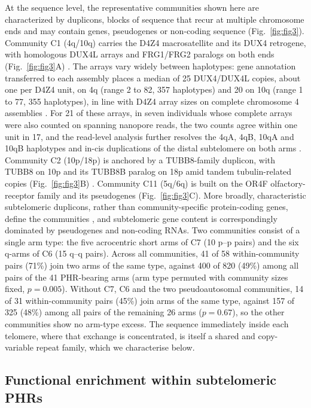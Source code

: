 \documentclass[pdflatex,mathphys]{jnl}
\begin{document}
At the sequence level, the representative communities shown here are
characterized by duplicons, blocks of sequence that recur at multiple
chromosome ends and may contain genes, pseudogenes or non-coding sequence
(Fig.~\ref{fig:fig3}).
Community C1 (4q/10q) carries the D4Z4 macrosatellite and its DUX4 retrogene, with
homologous DUX4L arrays and FRG1/FRG2 paralogs on both ends (Fig.~\ref{fig:fig3}A)
\cite{dux4_d4z4_fshd_lemmers2010worldwide,Cabianca2012}.
The arrays vary widely between haplotypes: gene annotation transferred to each assembly
places a median of 25 DUX4/DUX4L copies, about one per D4Z4 unit, on 4q (range 2 to 82,
357 haplotypes) and 20 on 10q (range 1 to 77, 355 haplotypes), in line with D4Z4 array
sizes on complete chromosome 4 assemblies \cite{Lucas2026}.
For 21 of these arrays, in seven individuals whose complete arrays were also counted on spanning
nanopore reads, the two counts agree within one unit in 17, and the read-level analysis further
resolves the 4qA, 4qB, 10qA and 10qB haplotypes and in-cis duplications of the distal subtelomere on
both arms \cite{Xiao2026}.
Community C2 (10p/18p) is anchored by a TUBB8-family duplicon, with TUBB8 on
10p and its TUBB8B paralog on 18p amid tandem tubulin-related copies
(Fig.~\ref{fig:fig3}B) \cite{Linardopoulou2005}.
Community C11 (5q/6q) is built on the OR4F olfactory-receptor family and its
pseudogenes (Fig.~\ref{fig:fig3}C).
More broadly, characteristic subtelomeric duplicons, rather than community-specific protein-coding genes, define the communities
\cite{Ambrosini2007}, and subtelomeric gene content is correspondingly dominated by pseudogenes and
non-coding RNAs. Two communities consist of a single arm type: the five acrocentric short arms of
C7 (10 p--p pairs) and the six q-arms of C6 (15 q--q pairs). Across all communities, 41 of 58
within-community pairs (71\%) join two arms of the same type, against 400 of 820 (49\%) among all
pairs of the 41 PHR-bearing arms (arm type permuted with community sizes fixed, $p = 0.005$).
Without C7, C6 and the two pseudoautosomal communities, 14 of 31 within-community pairs (45\%) join
arms of the same type, against 157 of 325 (48\%) among all pairs of the remaining 26 arms
($p = 0.67$), so the other communities show no arm-type excess. The sequence immediately
inside each telomere, where that exchange is concentrated, is itself a shared and copy-variable
repeat family, which we characterise below.

\subsection*{Functional enrichment within subtelomeric PHRs}
\end{document}

